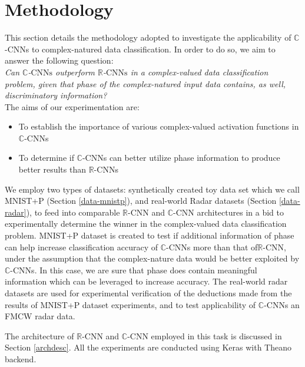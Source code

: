 \chapter{Methodology} \label{chap:methodology}
 
This section details the methodology adopted to investigate the applicability of $\mathbb{C}$-CNNs to complex-natured data classification. In order to do so, we aim to answer the following question:\\
 
 \textit{Can $\mathbb{C}$-$\mathrm{CNNs}$ outperform $\mathbb{R}$-$\mathrm{CNNs}$ in a complex-valued data classification problem, given that phase of the complex-natured input data contains, as well, discriminatory information?}\\
 
 The aims of our experimentation are:
 \begin{itemize}
 	\item To establish the importance of various complex-valued activation functions in $\mathbb{C}$-CNNs
 	\item To determine if $\mathbb{C}$-CNNs can better utilize phase information to produce better results than $\mathbb{R}$-CNNs
 \end{itemize}
 
 
 We employ two types of datasets: synthetically created toy data set which we call MNIST+P (Section \ref{data-mnistp}), and real-world Radar datasets (Section \ref{data-radar}), to feed into comparable $\mathbb{R}$-CNN and $\mathbb{C}$-CNN architectures in a bid to experimentally determine the winner in the complex-valued data classification problem. MNIST+P dataset is created to test if additional information of phase can help increase classification accuracy of $\mathbb{C}$-CNNs more than that of$\mathbb{R}$-CNN, under the assumption that the complex-nature data would be better exploited by $\mathbb{C}$-CNNs. In this case, we are sure that phase does contain meaningful information which can be leveraged to increase accuracy. The real-world radar datasets are used for experimental verification of the deductions made from the results of MNIST+P dataset experiments, and to test applicability of $\mathbb{C}$-CNNs an FMCW radar data.
 
 The architecture of $\mathbb{R}$-CNN and $\mathbb{C}$-CNN employed in this task is discussed in Section \ref{archdesc}.  All the experiments are conducted using Keras \cite{chollet2015keras} with Theano \cite{theano} backend.
 
